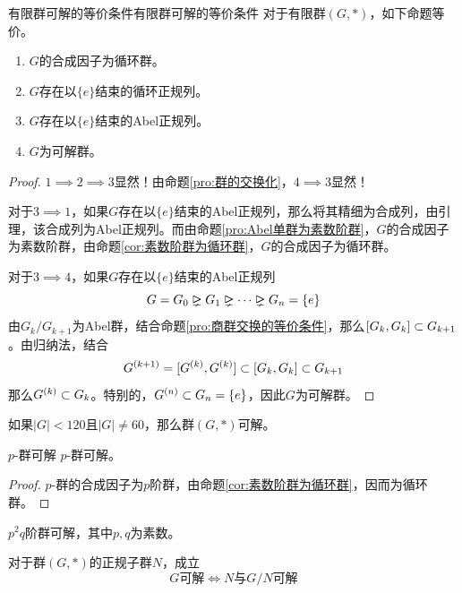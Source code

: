 \begin{proposition}{有限群可解的等价条件}{有限群可解的等价条件}
	对于有限群$(G,*)$，如下命题等价。
	\begin{enumerate}
		\item $G$的合成因子为循环群。
		\item $G$存在以$\{e\}$结束的循环正规列。
		\item $G$存在以$\{e\}$结束的Abel正规列。
		\item $G$为可解群。
	\end{enumerate}
\end{proposition}

\begin{proof}
	$1\implies 2\implies 3$显然！由命题\ref{pro:群的交换化}，$4\implies 3$显然！
	
	对于$3\implies 1$，如果$G$存在以$\{e\}$结束的Abel正规列，那么将其精细为合成列，由引理，该合成列为Abel正规列。而由命题\ref{pro:Abel单群为素数阶群}，$G$的合成因子为素数阶群，由命题\ref{cor:素数阶群为循环群}，$G$的合成因子为循环群。
	
	对于$3\implies 4$，如果$G$存在以$\{e\}$结束的Abel正规列
	$$
	G=G_0\rhdneq G_1\rhdneq \cdots\rhdneq G_n=\{e\}
	$$
	由$G_{k}/G_{k+1}$为Abel群，结合命题\ref{pro:商群交换的等价条件}，那么$[G_{k},G_{k}]\subset G_{k+1}$。由归纳法，结合
	$$
	G^{(k+1)}=[G^{(k)},G^{(k)}]\subset [G_k,G_k]\subset G_{k+1}
	$$
	那么$G^{(k)}\subset G_{k}$。特别的，$G^{(n)}\subset G_n=\{e\}$，因此$G$为可解群。
\end{proof}

\begin{corollary}
	如果$|G|<120$且$|G|\ne 60$，那么群$(G,*)$可解。
\end{corollary}

\begin{corollary}{$p$-群可解}
	$p$-群可解。
\end{corollary}

\begin{proof}
	$p$-群的合成因子为$p$阶群，由命题\ref{cor:素数阶群为循环群}，因而为循环群。
\end{proof}

\begin{corollary}
	$p^2q$阶群可解，其中$p,q$为素数。
\end{corollary}

\begin{corollary}
	对于群$(G,*)$的正规子群$N$，成立
	$$
	G\text{可解}\iff N\text{与}G/N\text{可解}
	$$
\end{corollary}

